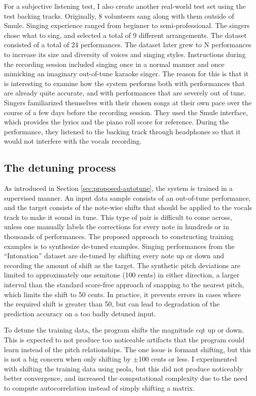For a subjective listening test, I also create another real-world test set using the test backing tracks. Originally, 8 volunteers sang along with them outside of Smule. Singing experience ranged from beginner to semi-professional. The singers chose what to sing, and selected a total of 9 different arrangements. The dataset consisted of a total of 24 performances. The dataset later grew to N performances to increase its size and diversity of voices and singing styles. Instructions during the recording session included singing once in a normal manner and once mimicking an imaginary out-of-tune karaoke singer. The reason for this is that it is interesting to examine how the system performs both with performances that are already quite accurate, and with performances that are severely out of tune. Singers familiarized themselves with their chosen songs at their own pace over the course of a few days before the recording session. They used the Smule interface, which provides the lyrics and the piano roll score for reference. During the performance, they listened to the backing track through headphones so that it would not interfere with the vocals recording.

\subsection{The detuning process}
As introduced in Section \ref{sec:proposed-autotune}, the system is trained in a supervised manner. An input data sample consists of an out-of-tune performance, and the target consists of the note-wise shifts that should be applied to the vocals track to make it sound in tune. This type of pair is difficult to come across, unless one manually labels the corrections for every note in hundreds or in thousands of performances. The proposed approach to constructing training examples is to synthesize de-tuned examples. Singing performances from the ``Intonation'' dataset are de-tuned by shifting every note up or down and recording the amount of shift as the target. The synthetic pitch deviations are limited to approximately one semitone (100 cents) in either direction, a larger interval than the standard score-free approach of snapping to the nearest pitch, which limits the shift to 50 cents. In practice, it prevents errors in cases where the required shift is greater than 50, but can lead to degradation of the prediction accuracy on a too badly detuned input. 

To detune the training data, the program shifts the magnitude \gls{cqt} up or down. This is expected to not produce too noticeable artifacts that the program could learn instead of the pitch relationships. The one issue is formant shifting, but this is not a big concern when only shifting by $\pm$100 cents or less. I experimented with shifting the training data using \gls{psola}, but this did not produce noticeably better convergence, and increased the computational complexity due to the need to compute autocorrelation instead of simply shifting a matrix. 


